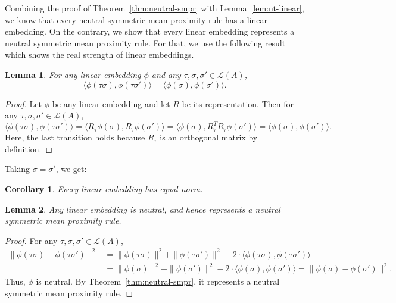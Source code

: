 \documentclass[10pt,letterpaper]{article}
\newcommand{\calL}{{\mathcal{L}}}
\newcommand{\rank}{{\calL(A)}}
\newtheorem{lemma}{Lemma}
\newtheorem{corollary}{Corollary}
\begin{document}
Combining the proof of Theorem~\ref{thm:neutral-smpr} with Lemma~\ref{lem:nt-linear}, we know that every neutral symmetric mean proximity rule has a linear embedding. On the contrary, we show that every linear embedding represents a neutral symmetric mean proximity rule. For that, we use the following result which shows the real strength of linear embeddings.
\begin{lemma}
For any linear embedding $\phi$ and any $\tau,\sigma,\sigma' \in \rank$, 
$$
\langle \phi(\tau \sigma), \phi(\tau \sigma') \rangle = \langle \phi(\sigma), \phi(\sigma') \rangle.
$$
\label{lem:inner-product-preserve}
\end{lemma}
\begin{proof}
Let $\phi$ be any linear embedding and let $R$ be its representation. Then for any $\tau,\sigma,\sigma' \in \rank$,
\begin{equation}
\langle \phi(\tau \sigma), \phi(\tau \sigma') \rangle = \langle R_{\tau}\phi(\sigma), R_{\tau}\phi(\sigma') \rangle = \langle \phi(\sigma), R_{\tau}^T R_{\tau}\phi(\sigma') \rangle = \langle \phi(\sigma), \phi(\sigma') \rangle.
\label{eqn:linear-inner-product}
\end{equation}
Here, the last transition holds because $R_{\tau}$ is an orthogonal matrix by definition. 
\end{proof}
Taking $\sigma = \sigma'$, we get:
\begin{corollary}
Every linear embedding has equal norm.
\label{cor:linear-equal-norm}
\end{corollary}

\begin{lemma}
Any linear embedding is neutral, and hence represents a neutral symmetric mean proximity rule.
\label{lem:linear-neutral}
\end{lemma}
\begin{proof}
For any $\tau,\sigma,\sigma' \in \rank$,
\begin{align*}
\|\phi(\tau \sigma)-\phi(\tau \sigma')\|^2 &= \|\phi(\tau \sigma)\|^2 + \|\phi(\tau \sigma')\|^2 - 2\cdot \langle \phi(\tau \sigma), \phi(\tau \sigma') \rangle \\
&= \|\phi(\sigma)\|^2 + \|\phi(\sigma')\|^2 - 2\cdot \langle \phi(\sigma), \phi(\sigma') \rangle = \|\phi(\sigma)-\phi(\sigma')\|^2.
\end{align*}
Thus, $\phi$ is neutral. By Theorem~\ref{thm:neutral-smpr}, it represents a neutral symmetric mean proximity rule.
\end{proof}
\end{document}
